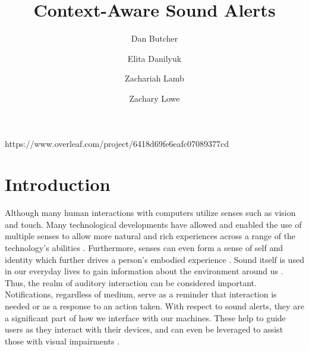 \documentclass[manuscript,screen,review]{acmart}
\begin{document}
\title{Context-Aware Sound Alerts}

\author{Dan Butcher}

\author{Elita Danilyuk}

\author{Zachariah Lamb}

\author{Zachary Lowe}

\maketitle
https://www.overleaf.com/project/6418d69fe6eafc07089377cd


\section{Introduction}

Although many human interactions with computers utilize senses such as vision and touch. Many technological developments have allowed and enabled the use of multiple senses to allow more natural and rich experiences across a range of the technology's abilities \cite{3411763.3441356}. Furthermore, senses can even form a sense of self and identity which further drives a person's embodied experience \cite{azanon2016multimodal}. Sound itself is used in our everyday lives to gain information about the environment around us \cite{1859799.1859808}. Thus, the realm of auditory interaction can be considered important. Notifications, regardless of medium, serve as a reminder that interaction is needed or as a response to an action taken. With respect to sound alerts, they are a significant part of how we interface with our machines. These help to guide users as they interact with their devices, and can even be leveraged to assist those with visual impairments \cite{10.1145/3232078.3232083}.
\end{document}
